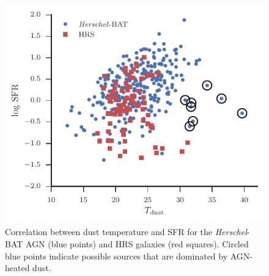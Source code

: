 \documentclass[fleqn, usenatbib]{mnras}
\newcommand{\herschel}{\emph{Herschel}}
\newcommand{\mstar}{$M_{\mathrm{star}}$}
\newcommand{\mdust}{$M_{\rm dust}$}
\newcommand{\tdust}{$T_{\rm dust}$}
\begin{document}
\begin{figure}
\includegraphics[width=\columnwidth]{figures/sfr_vs_tdust}
\caption{Correlation between dust temperature and SFR for the \herschel-BAT AGN (blue points) and HRS galaxies (red squares). Circled blue points indicate possible sources that are dominated by AGN-heated dust. \label{fig:sfr_tdust}}
\end{figure}


 
\end{document}
